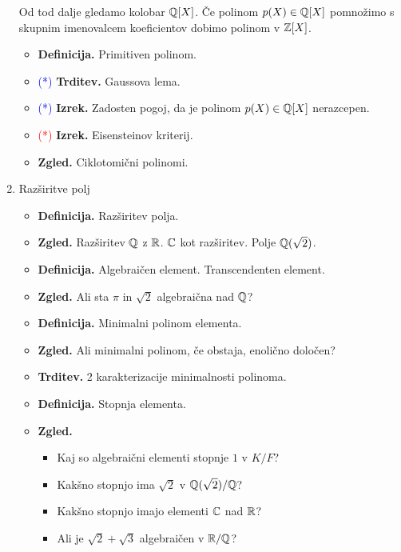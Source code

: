 \begin{enumerate}
    Od tod dalje gledamo kolobar \(\mathbb{Q}[X]\). Če polinom \(p(X) \in \mathbb{Q}[X]\) pomnožimo s skupnim imenovalcem koeficientov dobimo polinom v \(\mathbb{Z}[X]\).
    \begin{itemize}
        \item \textbf{Definicija.} Primitiven polinom.
        \item \textcolor{blue}{(*)} \textbf{Trditev.} Gaussova lema.
        \item \textcolor{blue}{(*)} \textbf{Izrek.} Zadosten pogoj, da je polinom \(p(X) \in \mathbb{Q}[X]\) nerazcepen.
        \item \textcolor{red}{(*)} \textbf{Izrek.} Eisensteinov kriterij.
        \item \textbf{Zgled.} Ciklotomični polinomi.
    \end{itemize}

    \item Razširitve polj
    \begin{itemize}
        \item \textbf{Definicija.} Razširitev polja.
        \item \textbf{Zgled.} Razširitev \(\mathbb{Q}\) z \(\mathbb{R}\). \(\mathbb{C}\) kot razširitev. Polje \(\mathbb{Q}(\sqrt{2})\).
        \item \textbf{Definicija.} Algebraičen element. Transcendenten element.
        \item \textbf{Zgled.} Ali sta \(\pi\) in \(\sqrt{2}\) algebraična nad \(\mathbb{Q}\)?
        \item \textbf{Definicija.} Minimalni polinom elementa.
        \item \textbf{Zgled.} Ali minimalni polinom, če obstaja, enolično določen?
        \item \textbf{Trditev.} 2 karakterizacije minimalnosti polinoma.
        \item \textbf{Definicija.} Stopnja elementa.
        \item \textbf{Zgled.} \
        \begin{itemize}
            \item Kaj so algebraični elementi stopnje \(1\) v \(K/F\)?
            \item Kakšno stopnjo ima \(\sqrt{2}\) v \(\mathbb{Q}(\sqrt{2})/\mathbb{Q}\)?
            \item Kakšno stopnjo imajo elementi \(\mathbb{C}\) nad \(\mathbb{R}\)?
            \item Ali je \(\sqrt{2} + \sqrt{3}\) algebraičen v \(\mathbb{R}/\mathbb{Q}\)?
        \end{itemize}
    \end{itemize}


\end{enumerate}
